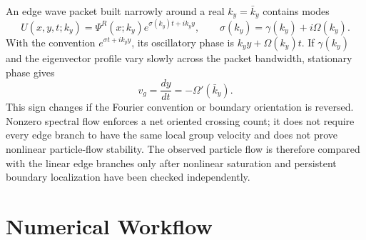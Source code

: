 \documentclass[11pt]{article}
\numberwithin{equation}{section}
\begin{document}
An edge wave packet built narrowly around a real $k_y=\bar k_y$ contains
modes
\begin{equation}
  U(x,y,t;k_y)=\Psi^R(x;k_y)e^{\sigma(k_y)t+ik_y y},
  \qquad
  \sigma(k_y)=\gamma(k_y)+i\Omega(k_y).
\end{equation}
With the convention $e^{\sigma t+ik_yy}$, its oscillatory phase is
$k_yy+\Omega(k_y)t$.  If $\gamma(k_y)$ and the eigenvector profile vary
slowly across the packet bandwidth, stationary phase gives
\begin{equation}
  v_g=\frac{dy}{dt}=-\Omega'(\bar k_y).
  \label{eq:edge_group_velocity}
\end{equation}
This sign changes if the Fourier convention or boundary orientation is
reversed.  Nonzero spectral flow enforces a net oriented crossing count;
it does not require every edge branch to have the same local group velocity
and does not prove nonlinear particle-flow stability.  The observed
particle flow is therefore compared with the linear edge branches only
after nonlinear saturation and persistent boundary localization have been
checked independently.

\section{Numerical Workflow}
\end{document}
